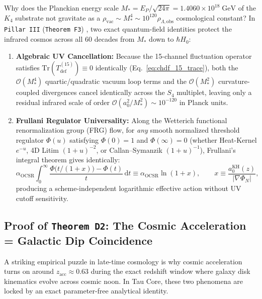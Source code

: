 \documentclass[11pt,a4paper]{article}
\theoremstyle{remark}
\begin{document}
Why does the Planckian energy scale $M_* = E_P/\sqrt{24\pi} = 1.4060 \times 10^{18}\;\mathrm{GeV}$ of the $K_4$ substrate not gravitate as a $\rho_{\mathrm{vac}} \sim M_*^4 \sim 10^{120}\rho_{\Lambda,\mathrm{obs}}$ cosmological constant? In \texttt{Pillar III} (\texttt{Theorem F3}) \cite{JolcsakTauFoundationSeries2026}, two exact quantum-field identities protect the infrared cosmos across all 60 decades from $M_*$ down to $\hbar H_0$:
\begin{enumerate}
  \item \textbf{Algebraic UV Cancellation:} Because the 15-channel fluctuation operator satisfies $\mathrm{Tr}(T_{\mathrm{def}}^{(15)}) \equiv 0$ identically (Eq.~\eqref{eq:chdf_15_trace}), both the $\mathcal{O}(M_*^4)$ quartic/quadratic vacuum loop terms and the $\mathcal{O}(M_*^2)$ curvature-coupled divergences cancel identically across the $S_4$ multiplet, leaving only a residual infrared scale of order $\mathcal{O}(a_0^2 / M_*^2) \sim 10^{-120}$ in Planck units.
  \item \textbf{Frullani Regulator Universality:} Along the Wetterich functional renormalization group (FRG) flow, for \emph{any} smooth normalized threshold regulator $\Phi(u)$ satisfying $\Phi(0) = 1$ and $\Phi(\infty) = 0$ (whether Heat-Kernel $e^{-u}$, 4D Litim $(1+u)^{-2}$, or Callan--Symanzik $(1+u)^{-1}$), Frullani's integral theorem gives identically:
  \begin{equation}
    \alpha_{\mathrm{OCSR}}\int_0^\infty \frac{\Phi\!\bigl(t/(1+x)\bigr) - \Phi(t)}{t}\,\mathrm{d}t \equiv \alpha_{\mathrm{OCSR}}\ln(1 + x), \qquad x \equiv \frac{a_0^{\mathrm{KH}}(z)}{|\nabla\Phi_N|},
    \label{eq:frullani_rg}
  \end{equation}
  producing a scheme-independent logarithmic effective action without UV cutoff sensitivity.
\end{enumerate}

\subsection{Proof of \texttt{Theorem D2}: The Cosmic Acceleration = Galactic Dip Coincidence}

A striking empirical puzzle in late-time cosmology is why cosmic acceleration turns on around $z_{\mathrm{acc}} \approx 0.63$ during the exact redshift window where galaxy disk kinematics evolve across cosmic noon. In Tau Core, these two phenomena are locked by an exact parameter-free analytical identity.
\end{document}

